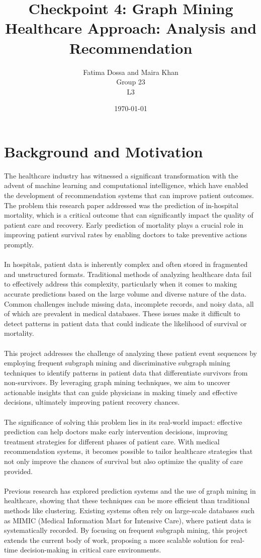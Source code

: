 \documentclass[11pt]{article}
\title{Checkpoint 4: Graph Mining Healthcare Approach: Analysis and Recommendation}
\author{Fatima Dossa and Maira Khan \\ Group 23  \\ L3}
\date{\today}
\begin{document}
\maketitle

\section{Background and Motivation}
The healthcare industry has witnessed a significant transformation with the advent of machine learning and computational intelligence, which have enabled the development of recommendation systems that can improve patient outcomes. The problem this research paper addressed was the prediction of in-hospital mortality, which is a critical outcome that can significantly impact the quality of patient care and recovery. Early prediction of mortality plays a crucial role in improving patient survival rates by enabling doctors to take preventive actions promptly. \\ \\
In hospitals, patient data is inherently complex and often stored in fragmented and unstructured formats. Traditional methods of analyzing healthcare data fail to effectively address this complexity, particularly when it comes to making accurate predictions based on the large volume and diverse nature of the data. Common challenges include missing data, incomplete records, and noisy data, all of which are prevalent in medical databases. These issues make it difficult to detect patterns in patient data that could indicate the likelihood of survival or mortality. \\ \\
This project addresses the challenge of analyzing these patient event sequences by employing frequent subgraph mining and discriminative subgraph mining techniques to identify patterns in patient data that differentiate survivors from non-survivors. By leveraging graph mining techniques, we aim to uncover actionable insights that can guide physicians in making timely and effective decisions, ultimately improving patient recovery chances. \\ \\
The significance of solving this problem lies in its real-world impact: effective prediction can help doctors make early intervention decisions, improving treatment strategies for different phases of patient care. With medical recommendation systems, it becomes possible to tailor healthcare strategies that not only improve the chances of survival but also optimize the quality of care provided. \\ \\
Previous research has explored prediction systems and the use of graph mining in healthcare, showing that these techniques can be more efficient than traditional methods like clustering. Existing systems often rely on large-scale databases such as MIMIC (Medical Information Mart for Intensive Care), where patient data is systematically recorded. By focusing on frequent subgraph mining, this project extends the current body of work, proposing a more scalable solution for real-time decision-making in critical care environments. \\
\end{document}
